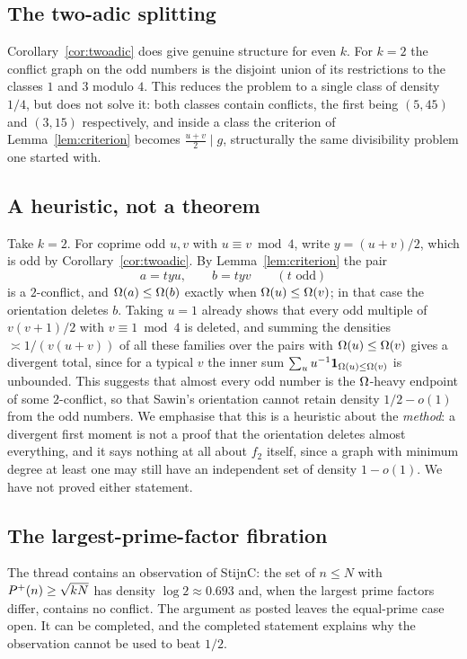 \documentclass[11pt]{article}
\begin{document}
\subsection{The two-adic splitting}

Corollary~\ref{cor:twoadic} does give genuine structure for even \(k\). For \(k=2\)
the conflict graph on the odd numbers is the disjoint union of its
restrictions to the classes \(1\) and \(3\) modulo \(4\). This reduces the
problem to a single class of density \(1/4\), but does not solve it: both
classes contain conflicts, the first being \((5,45)\) and \((3,15)\)
respectively, and inside a class the criterion of Lemma~\ref{lem:criterion}
becomes \(\frac{u+v}{2}\mid g\), structurally the same divisibility problem
one started with.

\subsection{A heuristic, not a theorem}

Take \(k=2\). For coprime odd \(u,v\) with \(u\equiv v\bmod4\), write
\(y=(u+v)/2\), which is odd by Corollary~\ref{cor:twoadic}. By
Lemma~\ref{lem:criterion} the pair
\[
 a=tyu,\qquad b=tyv\qquad(t\text{ odd})
\]
is a \(2\)-conflict, and \(\Omega(a)\leq\Omega(b)\) exactly when
\(\Omega(u)\leq\Omega(v)\); in that case the orientation deletes \(b\). Taking
\(u=1\) already shows that every odd multiple of \(v(v+1)/2\) with
\(v\equiv1\bmod4\) is deleted, and summing the densities
\(\asymp1/(v(u+v))\) of all these families over the pairs with
\(\Omega(u)\leq\Omega(v)\) gives a divergent total, since for a typical \(v\) the
inner sum \(\sum_u u^{-1}\mathbf 1_{\Omega(u)\leq\Omega(v)}\) is unbounded. This suggests
that almost every odd number is the \(\Omega\)-heavy endpoint of some
\(2\)-conflict, so that Sawin's orientation cannot retain density
\(1/2-o(1)\) from the odd numbers. We emphasise that this is a
heuristic about the \emph{method}: a divergent first moment is not a proof
that the orientation deletes almost everything, and it says nothing at all
about \(f_2\) itself, since a graph with minimum degree at least one may
still have an independent set of density \(1-o(1)\). We have not proved
either statement.

\subsection{The largest-prime-factor fibration}

The thread contains an observation of StijnC: the set of \(n\leq N\) with
\(P^+(n)\geq\sqrt{kN}\) has density \(\log2\approx0.693\) and, when the
largest prime factors differ, contains no conflict. The argument as posted
leaves the equal-prime case open. It can be completed, and the completed
statement explains why the observation cannot be used to beat \(1/2\).
\end{document}
